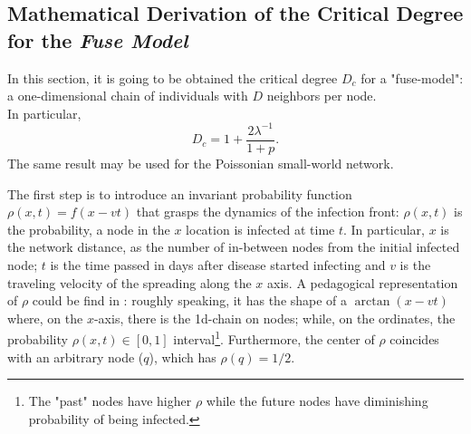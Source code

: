 \documentclass[a4paper,10pt]{book} %
\theoremstyle{definition}
\begin{document}
\subsection*{Mathematical Derivation of the Critical Degree for the \textit{Fuse Model} }

In this section, it is going to be obtained the critical degree $ D_c$  \cite{Thurner::NetBasedExpl} for a "fuse-model": a one-dimensional chain of individuals with $D$ neighbors per node.
\\In particular, 
\begin{equation}
	D_c = 1 + \frac{2 \lambda^{-1}}{1+p}.
	\label{eq:prelim_Dc_fusemodel}
\end{equation}
The same result may be used for the Poissonian small-world network.

The first step is to introduce an invariant probability function $\rho(x,t) = f(x-vt)$ that grasps the dynamics of the infection front: $\rho(x,t)$ is the probability, a node in the $x$ location is infected at time $t$.
In particular, $x$ is the network distance, as the number of in-between nodes from the initial infected node; $t$ is the time passed in days after disease started infecting and $v$ is the traveling velocity of the spreading along the $x$ axis.
A pedagogical representation of $\rho$ could be find in \cite{Thurner::Appendix_NetBasedExpl}: roughly speaking, it has the shape of a $\arctan(x-vt)$ where, on the $x$-axis, there is the 1d-chain on  nodes; while, on the ordinates, the probability $ \rho(x,t)\in [0,1]$ interval\footnote{The "past" nodes have higher $\rho$ while the future nodes have diminishing probability of being infected.}. Furthermore, the center of $ \rho$ coincides with an arbitrary node ($q$), which has $\rho(q) = 1/2$.
\end{document}
